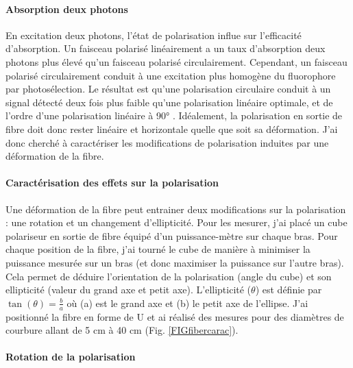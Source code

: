 
\paragraph{Absorption deux photons}

En excitation deux photons, l'état de polarisation influe sur l'efficacité d'absorption. Un faisceau polarisé linéairement a un taux d'absorption deux photons plus élevé qu'un faisceau polarisé circulairement. Cependant, un faisceau polarisé circulairement conduit à une excitation plus homogène du fluorophore par photosélection. Le résultat est qu'une polarisation circulaire conduit à un signal détecté deux fois plus faible qu'une polarisation linéaire optimale, et de l'ordre d'une polarisation linéaire à 90° \cite{de_vito_effects_2020}. Idéalement, la polarisation en sortie de fibre doit donc rester linéaire et horizontale quelle que soit sa déformation. J'ai donc cherché à caractériser les modifications de polarisation induites par une déformation de la fibre.


\paragraph{Caractérisation des effets sur la polarisation}

Une déformation de la fibre peut entrainer deux modifications sur la polarisation : une rotation et un changement d'ellipticité. Pour les mesurer, j'ai placé un cube polariseur en sortie de fibre équipé d'un puissance-mètre sur chaque bras. Pour chaque position de la fibre, j'ai tourné le cube de manière à minimiser la puissance mesurée sur un bras (et donc maximiser la puissance sur l'autre bras). Cela permet de déduire l'orientation de la polarisation (angle du cube) et son ellipticité (valeur du grand axe et petit axe). L'ellipticité ($\theta$) est définie par $\tan(\theta)=\frac{b}{a}$ où (a) est le grand axe et (b) le petit axe de l'ellipse. J'ai positionné la fibre en forme de U et ai réalisé des mesures pour des diamètres de courbure allant de 5 cm à 40 cm (Fig. \ref{FIGfibercarac}).

\paragraph{Rotation de la polarisation}

